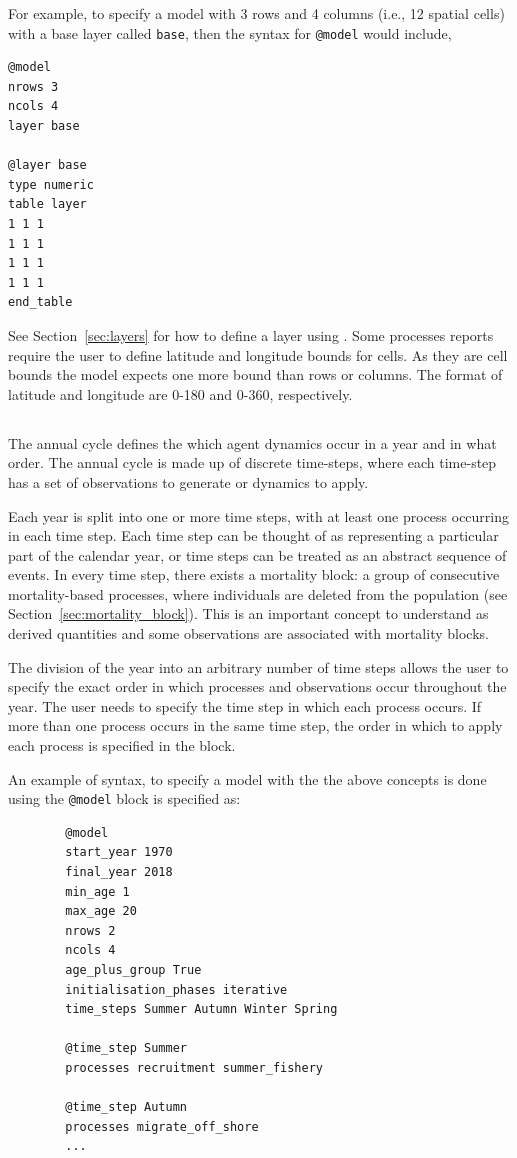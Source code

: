For example, to specify a model with 3 rows and 4 columns (i.e., 12 spatial cells) with a base layer called \texttt{base}, then the syntax for \texttt{@model} would include,

{\small{\begin{verbatim}
@model
nrows 3
ncols 4
layer base
		
@layer base
type numeric
table layer
1 1 1 
1 1 1
1 1 1
1 1 1 
end_table		
\end{verbatim}}}

See Section~\ref{sec:layers} for how to define a layer using . Some processes reports require the user to define latitude and longitude bounds for cells. As they are cell bounds the model expects one more bound than rows or columns. The format of latitude and longitude are 0-180 and 0-360, respectively.


\subsection{}\label{sub:sec:annualcylc}
The annual cycle defines the which agent dynamics occur in a year and in what order. The annual cycle is made up of discrete time-steps, where each time-step has a set of observations to generate or dynamics to apply. 

Each year is split into one or more time steps, with at least one process occurring in each time step. Each time step can be thought of as representing a particular part of the calendar year, or time steps can be treated as an abstract sequence of events. In every time step, there exists a mortality block: a group of consecutive mortality-based processes, where individuals are deleted from the population (see Section~\ref{sec:mortality_block}). This is an important concept to understand as derived quantities and some observations are associated with mortality blocks.

The division of the year into an arbitrary number of time steps allows the user to specify the exact order in which processes and observations occur throughout the year. The user needs to specify the time step in which each process occurs. If more than one process occurs in the same time step, the order in which to apply each process is specified in the  block.


An example of syntax, to specify a model with the the above concepts is done using the \texttt{@model} block is specified as:
{\small{\begin{verbatim}
		@model
		start_year 1970
		final_year 2018
		min_age 1
		max_age 20
		nrows 2
		ncols 4
		age_plus_group True
		initialisation_phases iterative
		time_steps Summer Autumn Winter Spring
		
		@time_step Summer
		processes recruitment summer_fishery 

		@time_step Autumn
		processes migrate_off_shore
		...
\end{verbatim}}}


